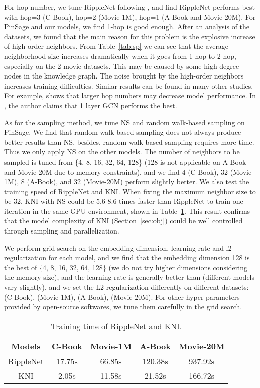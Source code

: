 \documentclass[sigconf]{acmart}
\begin{document}
For hop number, we tune RippleNet following \cite{wang2018ripplenet}, and find RippleNet performs best with hop=3 (C-Book), hop=2 (Movie-1M), hop=1 (A-Book and Movie-20M).
For PinSage and our models, we find 1-hop is good enough. 
After an analysis of the datasets, we found that the main reason for this problem is the explosive increase of high-order neighbors.
From Table~\ref{tab:sp} we can see that the average neighborhood size increases dramatically when it goes from 1-hop to 2-hop, especially on the 2 movie datasets.
This may be caused by some high degree nodes in the knowledge graph. 
The noise brought by the high-order neighbors increases training difficulties.
Similar results can be found in many other studies. For example,
\cite{wang2018ripplenet} shows that larger hop numbers may decrease model performance. 
In \cite{van2017graph}, the author claims that 1 layer GCN performs the best.


As for the sampling method, we tune NS and random walk-based sampling on PinSage.
We find that random walk-based sampling does not always produce better results than NS, besides, random walk-based sampling requires more time.
Thus we only apply NS on the other models.
The number of neighbors to be sampled is tuned from \{4, 8, 16, 32, 64, 128\} (128 is not applicable on A-Book and Movie-20M due to memory constraints), and we find 4 (C-Book), 32 (Movie-1M), 8 (A-Book), and 32 (Movie-20M) perform slightly better.
We also test the training speed of RippleNet and KNI. When fixing the maximum neighbor size to be 32, KNI with NS could be 5.6-8.6 times faster than RippleNet to train one iteration in the same GPU environment, shown in Table~\ref{tab:tr}. This result confirms that the model complexity of KNI (Section~\ref{sec:obj}) could be well controlled through sampling and parallelization.

We perform grid search on the embedding dimension, learning rate and l2 regularization for each model, and we find that the embedding dimension 128 is the best of \{4, 8, 16, 32, 64, 128\} (we do not try higher dimensions considering the memory size), and the learning rate  is generally better than  (different models vary slightly), and we set the L2 regularization differently on different datasets:  (C-Book),  (Movie-1M),  (A-Book),  (Movie-20M). For other hyper-parameters provided by open-source softwares, we tune them carefully in the grid search.

\begin{table}
    \centering
    \caption{Training time of RippleNet and KNI.}
    \label{tab:tr}
    \begin{tabular}{c|cccc} \hline
        Models & C-Book & Movie-1M & A-Book & Movie-20M \\ \hline \hline
        RippleNet & 17.75s & 66.85s & 120.38s & 937.92s \\
        KNI & 2.05s & 11.58s & 21.52s & 166.72s \\ \hline
    \end{tabular}
\end{table}
\end{document}
